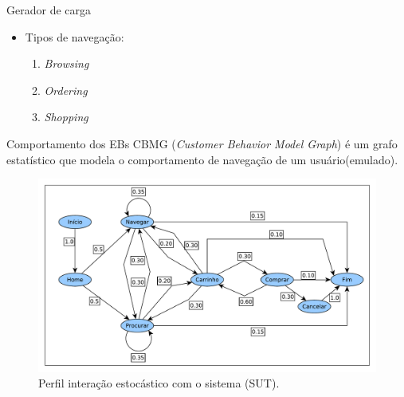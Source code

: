 \begin{frame}{Gerador de carga}
\begin{itemize}
\item Tipos de navegação:
\begin{enumerate}
	\item \textit{Browsing}
	\item \textit{Ordering}
	\item \textit{Shopping}
\end{enumerate}
\end{itemize}  


\end{frame}

\begin{frame}{Comportamento dos EBs}
CBMG (\textit{Customer Behavior Model Graph}) é um grafo estatístico que modela o comportamento de navegação de um usuário(emulado).

	\begin{figure}
		\center
		\includegraphics[scale=0.35]{images/CBMG}
		\caption{Perfil interação estocástico com o sistema (SUT).}
		\label{fig:CBMG}
	\end{figure}
\end{frame}